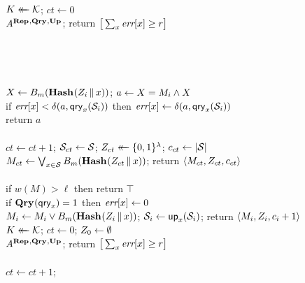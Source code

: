 \begin{figure*}
{
  \vspace{-7pt}
  \\[2pt]
    $K \mathrel{\leftarrow\mkern-14mu\leftarrow} \mathcal{K}$;
    $ct \gets 0$\\
    $\mathit{A}^{\textup{\textbf{Rep}}\hspace{0.5pt},\textup{\textbf{Qry}}\hspace{0.5pt},\textup{\textbf{Up}}\hspace{0.5pt}}$;
    return $\big[\sum_x \textit{err}[x] \geq r\big]$
  \\[6pt]
  \hfill{}\\[2pt]
    \\
  \\[6pt]
  \\[2pt]
    $X \gets {B}_m(\textup{\textbf{Hash}}\hspace{0.5pt}(Z_i \, \| \, x))$;
    $a \gets X = M_i \wedge X$\\
    if $\textit{err}[x] < \delta(a,\mathsf{qry}_x(\mathcal{S}_i))$ then
          $\textit{err}[x] \gets \delta(a,\mathsf{qry}_x(\mathcal{S}_i))$\\
    return $a$
  \\[6pt]
  \oraclev{$\REPO(\col)$}\\[2pt]
    $ct \gets ct+1$;
    $\mathcal{S}_{ct} \gets \mathcal{S}$;
    $Z_{ct} \mathrel{\leftarrow\mkern-14mu\leftarrow} \{0,1\}^\lambda$;
    $c_{ct} \gets |\mathcal{S}|$\\
    $M_{ct} \gets \bigvee_{x \in \mathcal{S}} {B}_m(\textup{\textbf{Hash}}\hspace{0.5pt}(Z_{ct} \, \| \, x))$;
    return $\langle M_{ct}, Z_{ct}, c_{ct} \rangle$
  \\[6pt]
  \\[2pt]
    if $w(M) > \ell$ then return $\top$\\
    if $\textup{\textbf{Qry}}\hspace{0.5pt}(\mathsf{qry}_x) = 1$ then $\textit{err}[x] \gets 0$\\
    $M_i \gets M_i \vee {B}_m(\textup{\textbf{Hash}}\hspace{0.5pt}(Z_i \, \| \, x))$;
    $\mathcal{S}_i \gets \mathsf{up}_x(\mathcal{S}_i)$;
    return $\langle M_i, Z_i, c_i+1\rangle$
}
{
  \vspace{-7pt}
  \hfill{}\\[2pt]
    $K \mathrel{\leftarrow\mkern-14mu\leftarrow} \mathcal{K}$;
    $ct \gets 0$;
    $Z_0 \gets \emptyset$\\
    $\mathit{A}^{\textup{\textbf{Rep}}\hspace{0.5pt},\textup{\textbf{Qry}}\hspace{0.5pt},\textup{\textbf{Up}}\hspace{0.5pt}}$;
    return $\big[\sum_x \textit{err}[x] \geq r\big]$
  \\[6pt]
  \oraclev{$\REPO(\col)$}\\[2pt]
    $ct \gets ct+1$;
}
\end{figure*}
